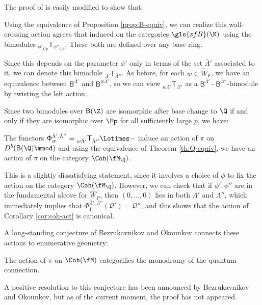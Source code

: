 The proof of \cite[Thm. 6.35]{BLPWgco} is easily modified to show that:



Using the equivalence of Proposition \ref{prop:B-equiv}, we can realize this wall-crossing action agrees that induced on the categories $\gls{sfB}(\K)$ using the bimodules ${}_{\phi'_{1/p}}\mathsf{T}_{\phi''_{1/p}}$. These both are defined over any base ring.  

Since this  depends on the parameter $\phi'$ only in terms of the set $\bar{\Lambda}'$ associated to it, we can denote this bimodule ${}_{\bar{\Lambda}'}\mathsf{T}_{\bar{\Lambda}''}$. As before, for each $w\in \widehat{W}_F$, we have an equivalence between $\mathsf{B}^{\bar{\Lambda}'}$ and $\mathsf{B}^{w\bar{\Lambda}'}$, so we can view ${}_{w\bar{\Lambda}'}\mathsf{T}_{\bar{\Lambda}''}$ as a $\mathsf{B}^{\bar{\Lambda}'}\operatorname{-}\mathsf{B}^{\bar{\Lambda}''}$-bimodule by twisting the left action.

Since two bimodules over $\mathsf{B}(\Z)$ are isomorphic after base change to $\Q$ if and only if they are isomorphic over $\Fp$ for all sufficiently large $p$, we have:
\begin{corollary}\label{cor:coh-act}
The functors $\mathsf{\Phi}_w^{\bar{\Lambda}',\bar{\Lambda}''}={}_{w\bar{\Lambda}'}\mathsf{T}_{\bar{\Lambda}''}\Lotimes -$  induce an action of $\pi$ on $D^b(\mathsf{B}(\Q)\mmod)$ 
and using the equivalence of Theorem \ref{th:Q-equiv}, we have an action of $\pi$ on the category $\Coh(\fM_\Q)$. 
\end{corollary} 

This is a slightly dissatisfying statement, since it involves a choice of $\phi$ to fix the action on the category $\Coh(\fM_\Q)$. However, we can check that if $\phi',\phi''$ are in the fundamental alcove for $\widehat{W}_F$, then $(0,\dots, 0)$ lies in both $\Lambda'$ and $\Lambda''$, which immediately implies that  $\mathsf{\Phi}_1^{\bar{\Lambda}',\bar{\Lambda}''} (\mathcal{Q}')=\mathcal{Q}''$, and this shows that the action of Corollary \ref{cor:coh-act} is canonical.  

A long-standing conjecture of Bezrukavnikov and Okounkov connects these actions to enumerative geometry:
\begin{conjecture}\label{conj:BO}
The action of $\pi$ on $\Coh(\fM)$ categorifies the monodromy of the quantum connection.
\end{conjecture}
A positive resolution to this conjecture has been announced by Bezrukavnikov and Okounkov, but as of the current moment, the proof has not appeared.






